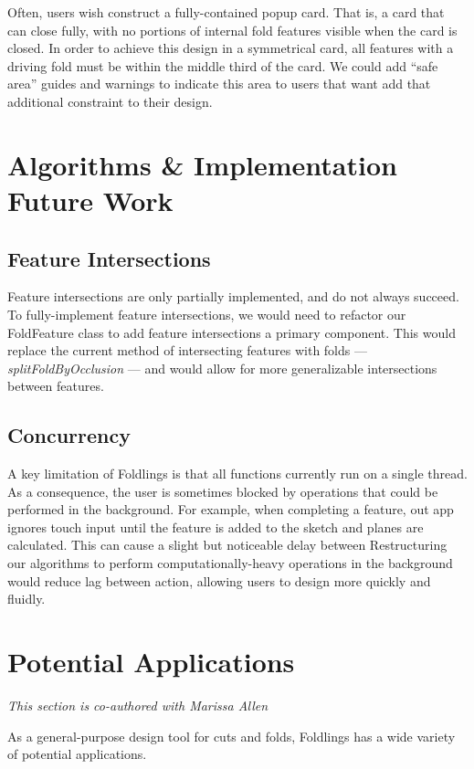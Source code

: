 Often, users wish construct a fully-contained popup card. That is, a
card that can close fully, with no portions of internal fold features
visible when the card is closed. In order to achieve this design in a
symmetrical card, all features with a driving fold must be within the
middle third of the card. We could add ``safe area'' guides and warnings
to indicate this area to users that want add that additional constraint
to their design.

\section{Algorithms \& Implementation Future
Work}\label{algorithms-implementation-future-work}

\subsection{Feature Intersections}\label{feature-intersections}

Feature intersections are only partially implemented, and do not always
succeed. To fully-implement feature intersections, we would need to
refactor our FoldFeature class to add feature intersections a primary
component. This would replace the current method of intersecting
features with folds --- \emph{splitFoldByOcclusion} --- and would allow
for more generalizable intersections between features.

\subsection{Concurrency}\label{concurrency}

A key limitation of Foldlings is that all functions currently run on a
single thread. As a consequence, the user is sometimes blocked by
operations that could be performed in the background. For example, when
completing a feature, out app ignores touch input until the feature is
added to the sketch and planes are calculated. This can cause a slight
but noticeable delay between Restructuring our algorithms to perform
computationally-heavy operations in the background would reduce lag
between action, allowing users to design more quickly and fluidly.

\section{Potential Applications}\label{potential-applications}

\emph{This section is co-authored with Marissa Allen}

As a general-purpose design tool for cuts and folds, Foldlings has a
wide variety of potential applications. \citet{blees2014graphene}
\citet{taylor2013think3d}
